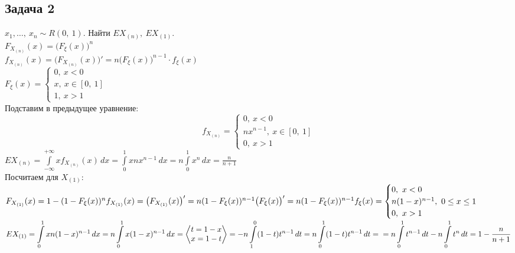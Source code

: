 \documentclass[12pt, a4paper]{article}
\begin{document}
\subsection*{Задача 2}
$x_1,\dots,\ x_n \sim R(0,\ 1)$. Найти $EX_{(n)},\ EX_{(1)}$.\\
$F_{X_{(n)}}(x) = \big( F_{\xi}(x) \big)^n$\\
$f_{X_{(n)}}(x) = \big( F_{X_{(n)}}(x) \big)' = n\big(F_{\xi}(x)\big)^{n - 1}\cdot f_{\xi}(x)$\\
$F_{\xi}(x) = \begin{cases}
        0,\ x < 0        \\
        x,\ x\in [0,\ 1] \\
        1,\ x > 1
    \end{cases}$\\
Подставим в предыдущее уравнение:
\[f_{X_{(n)}} = \begin{cases}
        0,\ x < 0                 \\
        nx^{n - 1},\ x\in [0,\ 1] \\
        0,\ x > 1
    \end{cases}\]
$EX_{(n)} = \displaystyle\int\limits_{-\infty}^{+\infty} xf_{X_{(n)}}(x)\, dx = \int\limits_0^1 xnx^{n - 1}\, dx = n\int\limits_0^1 x^n\, dx = \frac{n}{n + 1}$\\
Посчитаем для $X_{(1)}$:\\
$F_{X_{(1)}}(x) = 1 - (1 - F_{\xi}(x))^n\\
    f_{X_{(1)}}(x) = \big(F_{X_{(1)}}(x)\big)' = n(1 - F_{\xi}(x))^{n - 1} \big(F_{\xi}(x)\big)' = n(1 - F_{\xi}(x))^{n - 1} f_{\xi}(x) = \begin{cases}
        0,\ x < 0                          \\
        n(1 - x)^{n - 1},\ 0 \leq x \leq 1 \\
        0,\ x > 1
    \end{cases}$\\
$EX_{(1)} = \displaystyle \int\limits_0^1 xn(1 - x)^{n - 1}\, dx = n\int\limits_0^1 x(1 - x)^{n - 1}\, dx = \left< \begin{matrix}
        t = 1 - x \\
        x = 1 - t
    \end{matrix}\right> = -n\int\limits_1^0 (1 - t)t^{n - 1}\, dt = n\int\limits_0^1(1 - t)t^{n - 1}\, dt =\\
    = n\int\limits_0^1 t^{n - 1}\, dt - n\int\limits_0^1 t^{n}\, dt = 1 - \frac{n}{n + 1}$
\end{document}
